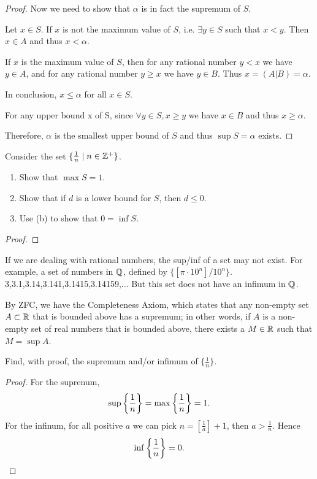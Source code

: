 \begin{proof}
Now we need to show that $\alpha$ is in fact the supremum of $S$.

Let $x\in S$. If $x$ is not the maximum value of $S$, i.e. $\exists y \in S$ such that $x<y$. Then $x\in A$ and thus $x<\alpha$.

If $x$ is the maximum value of $S$, then for any rational number $y<x$ we have $y\in A$, and for any rational number $y\ge x$ we have $y\in B$. Thus $x=(A|B)=\alpha$.

In conclusion, $x\le\alpha$ for all $x\in S$.

For any upper bound x of S, since $\forall y\in S, x\ge y$ we have $x\in B$ and thus $x\ge \alpha$.

Therefore, $\alpha$ is the smallest upper bound of $S$ and thus $\sup S=\alpha$ exists.
\end{proof}

\begin{prbm}
Consider the set $\{\frac{1}{n} \mid n\in\mathbb Z^{+}\}$.
\begin{enumerate}[label=(\alph*)]
\item Show that $\max S = 1$.
\item Show that if $d$ is a lower bound for $S$, then $d \le 0$.
\item Use (b) to show that $0 = \inf S$.
\end{enumerate}
\end{prbm}

\begin{proof}

\end{proof}

If we are dealing with rational numbers, the sup/inf of a set may not exist. For example, a set of numbers in $\mathbb Q$, defined by $\{[\pi\cdot10^n]/10^n\}$.
3,3.1,3.14,3.141,3.1415,3.14159,...
But this set does not have an infimum in $\mathbb Q$.

By ZFC, we have the Completeness Axiom, which states that any non-empty set $A \subset \mathbb R$ that is bounded above has a supremum; in other words, if $A$ is a non-empty set of real numbers that is bounded above, there exists a $M \in \mathbb R$ such that $M = \sup A$.




\begin{prbm}
Find, with proof, the supremum and/or infimum of $\{\frac{1}{n}\}$.
\end{prbm}

\begin{proof}
For the suprenum,
\[ \sup\left\{\frac{1}{n}\right\} = \max\left\{\frac{1}{n}\right\} = 1. \]
For the infinum, for all positive $a$ we can pick $n=[\frac{1}{a}]+1$, then $a>\frac{1}{n}$. Hence 
\[ \inf\left\{\frac{1}{n}\right\}=0. \]
\end{proof}

